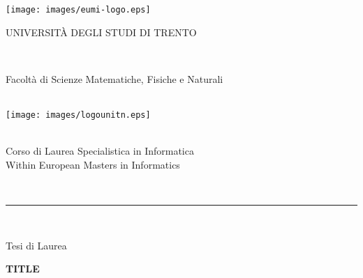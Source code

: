 
\enlargethispage{5cm} \thispagestyle{empty} \vsize=25.0cm

\begin{titlepage}
    \begin{center}
    \vspace{-7.3cm}
    \texttt{[image: images/eumi-logo.eps]}\\
%
 \vspace{0.3cm}
        \begin{LARGE}
        UNIVERSIT\`A DEGLI STUDI DI TRENTO
        \end{LARGE}\\
    \begin{large}
        Facolt\`a di Scienze Matematiche, Fisiche e Naturali\\
    \end{large}
        \ \\
    \vspace{0.5cm}
    \texttt{[image: images/logounitn.eps]}\\
    \vspace{-0.3cm}
    \begin{Large}
        \ \\
        Corso di Laurea Specialistica in Informatica\\
        Within European Masters in Informatics
        \end{Large}
        \ \\
        \hrule
        \ \\
        \begin{Large}
        Tesi di Laurea\\
        \end{Large}
        \vspace{1.6cm}
    \begin{center}
    \begin{LARGE}
        \textbf{TITLE}\\
        \end{LARGE}
    \end{center}


\end{center}
\end{titlepage}
